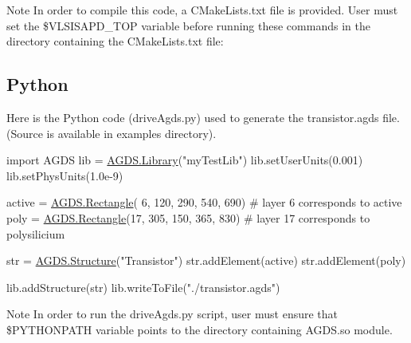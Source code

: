 \begin{DoxyNote}{Note}
In order to compile this code, a C\+Make\+Lists.\+txt file is provided. User must set the \$\+V\+L\+S\+I\+S\+A\+P\+D\+\_\+\+T\+OP variable before running these commands in the directory containing the C\+Make\+Lists.\+txt file\+: 
\begin{DoxyCode}
\end{DoxyCode}

\end{DoxyNote}
\hypertarget{agds_agdsPython}{}\subsection{Python}\label{agds_agdsPython}
Here is the Python code ({\ttfamily drive\+Agds.\+py}) used to generate the transistor.\+agds file. (Source is available in examples directory). 
\begin{DoxyCodeInclude}
\textcolor{keyword}{import} AGDS
lib = \hyperlink{class_a_g_d_s_1_1_library}{AGDS.Library}(\textcolor{stringliteral}{"myTestLib"})
lib.setUserUnits(0.001)
lib.setPhysUnits(1.0e-9)

active = \hyperlink{class_a_g_d_s_1_1_rectangle}{AGDS.Rectangle}( 6, 120, 290, 540, 690) \textcolor{comment}{# layer  6 corresponds to active}
poly   = \hyperlink{class_a_g_d_s_1_1_rectangle}{AGDS.Rectangle}(17, 305, 150, 365, 830) \textcolor{comment}{# layer 17 corresponds to polysilicium}

str = \hyperlink{class_a_g_d_s_1_1_structure}{AGDS.Structure}(\textcolor{stringliteral}{"Transistor"})
str.addElement(active)
str.addElement(poly)

lib.addStructure(str)
lib.writeToFile(\textcolor{stringliteral}{"./transistor.agds"})
\end{DoxyCodeInclude}


\begin{DoxyNote}{Note}
In order to run the {\ttfamily drive\+Agds.\+py} script, user must ensure that \$\+P\+Y\+T\+H\+O\+N\+P\+A\+TH variable points to the directory containing A\+G\+D\+S.\+so module. 
\end{DoxyNote}
